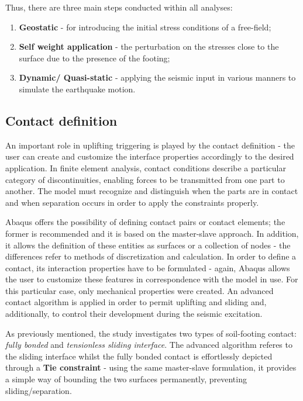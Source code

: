 Thus, there are three main steps conducted within all analyses:
\begin{enumerate}
	\item \textbf{Geostatic} - for introducing the initial stress conditions of a free-field;
	\item \textbf{Self weight application} - the perturbation on the stresses close to the surface due to the presence of the footing;
	\item \textbf{Dynamic/ Quasi-static} - applying the seismic input in various manners to simulate the earthquake motion.
\end{enumerate}

\subsection{Contact definition}
An important role in uplifting triggering is played by the contact definition - the user can create and customize the interface properties accordingly to the desired application. In finite element analysis, contact conditions describe a particular category of discontinuities, enabling forces to be transmitted from one part to another. The model must recognize and distinguish when the parts are in contact and when separation occurs in order to apply the constraints properly. 

Abaqus offers the possibility of defining contact pairs or contact elements; the former is recommended and it is based on the master-slave approach. In addition, it allows the definition of these entities as surfaces or a collection of nodes - the differences refer to methods of discretization and calculation. In order to define a contact, its interaction properties have to be formulated - again, Abaqus allows the user to customize these features in correspondence with the model in use. For this particular case, only mechanical properties were created. An advanced contact algorithm is applied in order to permit uplifting and sliding and, additionally, to control their development during the seismic excitation. 

As previously mentioned, the study investigates two types of soil-footing contact: \textit{fully bonded} and \textit{tensionless sliding interface}. The advanced algorithm referes to the sliding interface whilst the fully bonded contact is effortlessly depicted through a \textbf{Tie constraint} - using the same master-slave formulation, it provides a simple way of bounding the two surfaces permanently, preventing sliding/separation.

